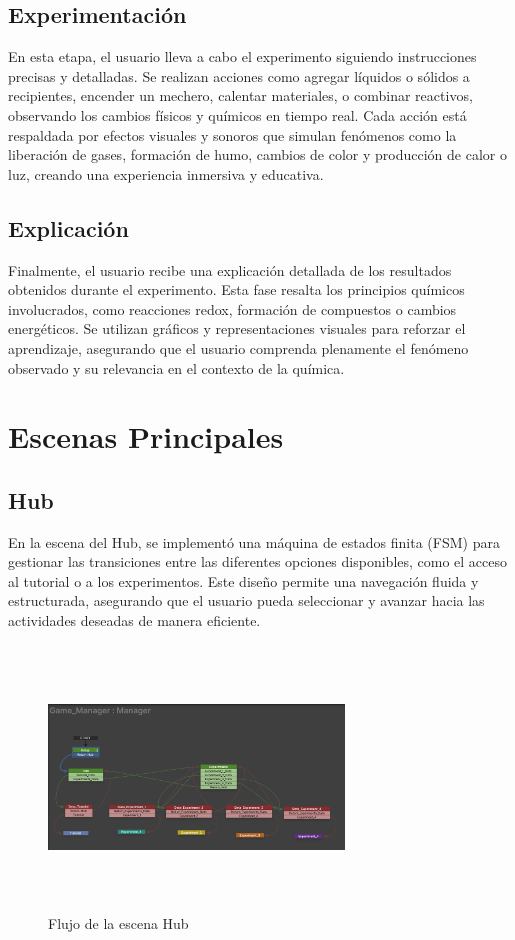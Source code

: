 \subsection{Experimentación}
En esta etapa, el usuario lleva a cabo el experimento siguiendo instrucciones precisas y detalladas. Se realizan acciones como agregar líquidos o sólidos a recipientes, encender un mechero, calentar materiales, o combinar reactivos, observando los cambios físicos y químicos en tiempo real. Cada acción está respaldada por efectos visuales y sonoros que simulan fenómenos como la liberación de gases, formación de humo, cambios de color y producción de calor o luz, creando una experiencia inmersiva y educativa.
\subsection{Explicación}
Finalmente, el usuario recibe una explicación detallada de los resultados obtenidos durante el experimento. Esta fase resalta los principios químicos involucrados, como reacciones redox, formación de compuestos o cambios energéticos. Se utilizan gráficos y representaciones visuales para reforzar el aprendizaje, asegurando que el usuario comprenda plenamente el fenómeno observado y su relevancia en el contexto de la química.
\newpage
\section{Escenas Principales}
\subsection{Hub}
En la escena del Hub, se implementó una máquina de estados finita (FSM) para gestionar las transiciones entre las diferentes opciones disponibles, como el acceso al tutorial o a los experimentos. Este diseño permite una navegación fluida y estructurada, asegurando que el usuario pueda seleccionar y avanzar hacia las actividades deseadas de manera eficiente.

\begin{figure}[thbp]
    \centering
    \includegraphics[width=0.7\textwidth, height = 7cm]{img/chapter05/Hub.png}
    \caption{Flujo de la escena Hub}
    \label{fig:FSM_Hub}
\end{figure}

